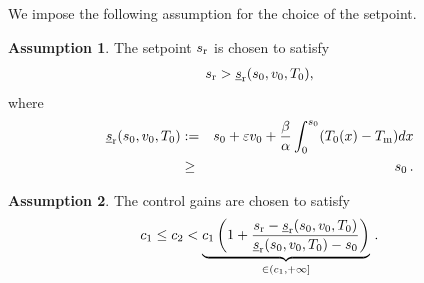 \documentclass[letterpaper, 10 pt, conference]{cls/ieeeconf}
\theoremstyle{definition}
\newtheorem{assum}{Assumption}
\newcommand{\ep}{\varepsilon}
\begin{document}
We impose the following assumption for the choice of the setpoint. 
\begin{assum} \label{ass:setpoint}
The setpoint $s_{\rm r}$ is chosen to satisfy
    \begin{align}
     s_{\rm r} > \underline{s}_{\rm r}(s_0, v_0, T_0)  , 
    \end{align}
    where 
    \begin{eqnarray}
    \underline{s}_{\rm r}(s_0, v_0, T_0) &:=& s_0 + \ep v_0 + \frac{  \beta}{ \alpha }  \int_0^{s_0}  (T_0(x) - T_{\rm m})  dx
    \nonumber\\
    &\geq & s_0 \,. \label{eq:setpoint-bound}    
    \end{eqnarray} 
\end{assum}

\begin{assum} \label{ass:gain-safe}
    The control gains are chosen to satisfy 
    \begin{align} \label{eq:gain-cond}
        c_1 \leq c_2 < \underbrace{c_1 \left(1+\frac{s_{\rm r} - \underline{s}_{\rm r}(s_0, v_0, T_0)}{ \underline{s}_{\rm r}(s_0, v_0, T_0) - s_0}\right)}_{\in(c_1,+\infty]}\,.
    \end{align}
\end{assum}
\end{document}
